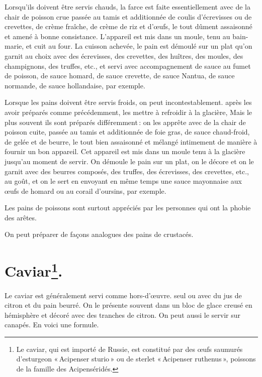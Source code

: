 Lorsqu'ils doivent être servis chauds, la farce est faite essentiellement avec
de la chair de poisson crue passée au tamis et additionnée de coulis
d'écrevisses ou de crevettes, de crème fraîche, de crème de riz et d'œufs, le
tout dûment assaisonné et amené à bonne consistance. L'appareil est mis dans un
moule, tenu au bain-marie, et cuit au four. La cuisson achevée, le pain est
démoulé sur un plat qu'on garnit au choix avec des écrevisses, des crevettes,
des huîtres, des moules, des champignons, des truffes, etc., et servi avec
accompagnement de sauce au fumet de poisson, de sauce homard, de sauce
crevette, de sauce Nantua, de sauce normande, de sauce hollandaise, par
exemple.

Lorsque les pains doivent être servis froids, on peut incontestablement. après
les avoir préparés comme précédemment, les mettre à refroidir à la glacière,
Mais le plus souvent ils sont préparés différemment : on les apprête avec de la
chair de poisson cuite, passée au tamis et additionnée de foie gras, de sauce
chaud-froid, de gelée et de beurre, le tout bien assaisonné et mélangé
intimement de manière à fournir un bon appareil. Cet appareil est mis dans un
moule tenu à la glacière jusqu'au moment de servir. On démoule le pain sur un
plat, on le décore et on le garnit avec des beurres composés, des truffes, des
écrevisses, des crevettes, etc., au goût, et on le sert en envoyant en même
temps une sauce mayonnaise aux œufs de homard ou au corail d'oursins, par
exemple.

Les pains de poissons sont surtout appréciés par les personnes qui ont la phobie
des arêtes.

\sk

On peut préparer de façons analogues des pains de crustacés.

\section*{\centering Caviar\footnote{Le caviar, qui est importé de Russie, est
constitué par des œufs saumurés d'esturgeon « Acipenser sturio » ou de sterlet
« Acipenser ruthenus », poissons de la famille des Acipenséridés.}.}


Le caviar est généralement servi comme hors-d'œuvre. seul ou avec du jus de
citron et du pain beurré. On le présente souvent dans un bloc de glace creusé
en hémisphère et décoré avec des tranches de citron. On peut aussi le servir
sur canapés. En voici une formule.

